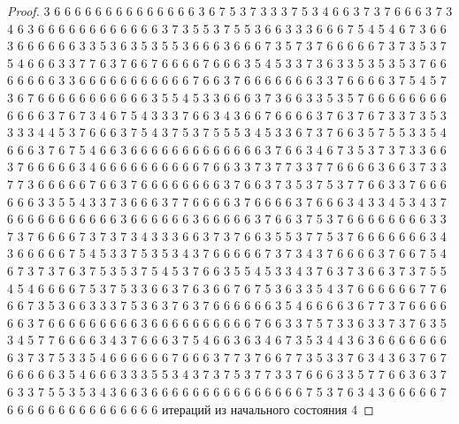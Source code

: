 \begin{proof}
	3 6 6 6 6 6 6 6 6 6 6 6 6 6 6 3 6 7 5 3 7 3 3 3 7 5 3 4 6 6 3 7 3 7 6 6 6 3 7 3 4 6 3 6 6 6 6 6 6 6 6 6 6 6 6 3 7 3 5 5 3 7 5 5 3 6 6 3 3 3 6 6 6 7 5 4 5 4 6 7 3 6 6 3 6 6 6 6 6 6 3 3 5 3 6 3 5 3 5 5 3 6 6 6 3 6 6 6 7 3 5 7 3 7 6 6 6 6 6 7 3 7 3 5 3 7 5 4 6 6 6 3 3 7 7 6 3 7 6 6 7 6 6 6 6 7 6 6 6 3 5 4 5 3 3 7 3 6 3 3 5 3 5 3 5 3 7 6 6 6 6 6 6 6 3 3 6 6 6 6 6 6 6 6 6 6 6 7 6 6 3 7 6 6 6 6 6 6 6 3 3 7 6 6 6 6 3 7 5 4 5 7 3 6 7 6 6 6 6 6 6 6 6 6 6 6 3 5 5 4 5 3 3 6 6 6 3 7 3 6 6 3 3 5 3 5 7 6 6 6 6 6 6 6 6 6 6 6 6 3 7 6 7 3 4 6 7 5 4 3 3 3 7 6 6 3 4 3 6 6 7 6 6 6 6 3 7 6 3 7 6 7 3 3 7 3 5 3 3 3 3 4 4 5 3 7 6 6 6 3 7 5 4 3 7 5 3 7 5 5 5 3 4 5 3 3 6 7 3 7 6 6 3 5 7 5 5 3 3 5 4 6 6 6 3 7 6 7 5 4 6 6 3 6 6 6 6 6 6 6 6 6 6 6 6 6 3 7 6 6 3 4 6 7 3 5 3 7 3 7 3 3 6 6 3 7 6 6 6 6 6 3 4 6 6 6 6 6 6 6 6 6 6 7 6 6 3 3 7 3 7 7 3 3 7 7 6 6 6 6 3 6 6 3 7 3 3 7 7 3 6 6 6 6 6 7 6 6 3 7 6 6 6 6 6 6 6 6 3 7 6 6 3 7 3 5 3 7 5 3 7 7 6 6 3 3 7 6 6 6 6 6 6 3 3 5 5 4 3 3 7 3 6 6 6 3 7 7 6 6 6 6 3 7 6 6 6 6 3 7 6 6 6 3 4 3 3 4 5 3 4 3 7 6 6 6 6 6 6 6 6 6 6 6 3 6 6 6 6 6 6 3 6 6 6 6 6 3 7 6 6 3 7 5 3 7 6 6 6 6 6 6 6 6 3 3 7 3 7 6 6 6 6 7 3 7 3 7 3 4 3 3 3 6 6 3 7 3 7 6 6 3 5 5 3 7 7 5 3 7 6 6 6 6 6 6 6 3 4 3 6 6 6 6 6 7 5 4 5 3 3 7 5 3 5 3 4 3 7 6 6 6 6 6 7 3 7 3 4 3 7 6 6 6 6 3 7 6 6 7 5 4 6 7 3 7 3 7 6 3 7 5 3 5 3 7 5 4 5 3 7 6 6 3 5 5 4 5 3 3 4 3 7 6 3 7 3 6 6 3 7 3 7 5 5 4 5 4 6 6 6 6 7 5 3 7 5 3 3 6 6 3 7 6 3 6 6 7 6 7 5 3 6 3 3 5 4 3 7 6 6 6 6 6 6 7 7 6 6 6 7 3 5 3 6 6 3 3 3 7 5 3 6 3 7 6 3 7 6 6 6 6 6 6 3 5 4 6 6 6 6 3 6 7 7 3 7 6 6 6 6 6 6 3 7 6 6 6 6 6 6 6 6 6 3 6 6 6 6 6 6 6 6 6 6 7 6 6 3 3 7 5 7 3 3 6 3 3 7 3 7 6 3 5 3 4 5 7 7 6 6 6 6 3 4 3 7 6 6 6 3 7 5 4 6 6 3 6 3 4 6 7 3 5 3 4 4 3 6 3 6 6 6 6 6 6 6 6 3 7 3 7 5 3 3 5 4 6 6 6 6 6 6 7 6 6 6 3 7 7 3 7 6 6 7 7 3 5 3 3 7 6 3 4 3 6 3 7 6 7 6 6 6 6 6 3 5 4 6 6 6 3 3 3 5 5 3 4 3 7 3 7 5 3 7 7 3 3 7 6 6 6 3 3 5 7 7 6 6 3 6 3 7 6 3 3 7 5 5 3 5 3 4 3 6 6 3 6 6 6 6 6 6 6 6 6 6 6 6 6 6 6 7 5 3 7 6 3 4 3 6 6 6 6 6 7 6 6 6 6 6 6 6 6 6 6 6 6 6 6 6 
	\newline
	 итераций из начального состояния 4
	\newline

\end{proof}
